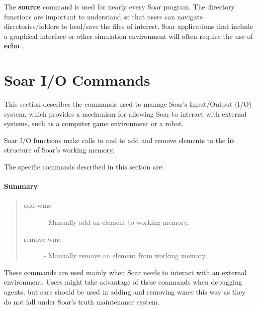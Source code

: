 The \textbf{source} command is used for nearly every Soar program.  The
directory functions are important to understand so that users can
navigate directories/folders to load/save the files of interest.  
Soar applications that include a graphical interface or other
simulation environment will often require the use of \textbf{echo}  .















\section{Soar I/O Commands}
\label{SOAR-IO}

This section describes the commands used to manage Soar's Input/Output
(I/O) system, which provides a mechanism for allowing Soar to interact 
with external systems, such as a computer game environment or a robot.  

Soar I/O functions make calls to  and 
to add and remove elements to the \textbf{io} structure of Soar's working
memory. 
 
The specific commands described in this section are:

\paragraph{Summary}
\begin{quote}
\begin{description}
\item[add-wme] - Manually add an element to working memory.
\item[remove-wme] - Manually remove an element from working memory.
\end{description}
\end{quote}

These commands are used mainly  when Soar needs to interact with an
external environment.  Users might take advantage of these commands when
debugging agents, but care should be used in adding and removing wmes this
way as they do not fall under Soar's truth maintenance system.

